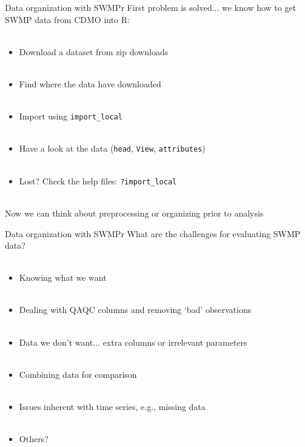 \documentclass[xcolor=dvipsnames,serif]{beamer}\usepackage[]{graphicx}\usepackage[]{color}
\begin{document}
\begin{frame}[fragile]{Data organization with SWMPr}
First problem is solved... we know how to get SWMP data from CDMO into R: \\~\\
\begin{itemize}
\item Download a dataset from zip downloads \\~\\
\item Find where the data have downloaded \\~\\
\item Import using \texttt{import_local} \\~\\
\item Have a look at the data (\texttt{head}, \texttt{View}, \texttt{attributes}) \\~\\
\item Lost? Check the help files: \texttt{?import\_local}\\~\\
\end{itemize}
Now we can think about preprocessing or organizing prior to analysis
\end{frame}

\begin{frame}[t]{Data organization with SWMPr}
\onslide<+->
What are the challenges for evaluating SWMP data? \\~\\
\onslide<+->
\begin{itemize}
\item Knowing what we want \\~\\
\item Dealing with QAQC columns and removing `bad' observations \\~\\
\item Data we don't want... extra columns or irrelevant parameters \\~\\
\item Combining data for comparison\\~\\
\item Issues inherent with time series, e.g., missing data \\~\\
\item Others?
\end{itemize}
\end{frame}
\end{document}
